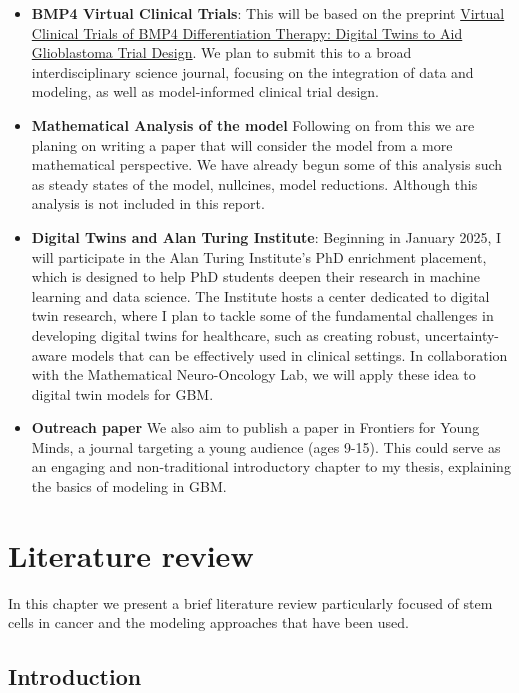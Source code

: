 \documentclass[
  letterpaper,
]{scrreprt}
\theoremstyle{definition}
\theoremstyle{remark}
\begin{document}
\begin{itemize}
\item
  \textbf{BMP4 Virtual Clinical Trials}: This will be based on the
  preprint
  \href{https://www.biorxiv.org/content/10.1101/2024.08.22.609156v1.abstract}{Virtual
  Clinical Trials of BMP4 Differentiation Therapy: Digital Twins to Aid
  Glioblastoma Trial Design}. We plan to submit this to a broad
  interdisciplinary science journal, focusing on the integration of data
  and modeling, as well as model-informed clinical trial design.
\item
  \textbf{Mathematical Analysis of the model} Following on from this we
  are planing on writing a paper that will consider the model from a
  more mathematical perspective. We have already begun some of this
  analysis such as steady states of the model, nullcines, model
  reductions. Although this analysis is not included in this report.
\item
  \textbf{Digital Twins and Alan Turing Institute}: Beginning in January
  2025, I will participate in the Alan Turing Institute's PhD enrichment
  placement, which is designed to help PhD students deepen their
  research in machine learning and data science. The Institute hosts a
  center dedicated to digital twin research, where I plan to tackle some
  of the fundamental challenges in developing digital twins for
  healthcare, such as creating robust, uncertainty-aware models that can
  be effectively used in clinical settings. In collaboration with the
  Mathematical Neuro-Oncology Lab, we will apply these idea to digital
  twin models for GBM.
\item
  \textbf{Outreach paper} We also aim to publish a paper in Frontiers
  for Young Minds, a journal targeting a young audience (ages 9-15).
  This could serve as an engaging and non-traditional introductory
  chapter to my thesis, explaining the basics of modeling in GBM.
\end{itemize}


\chapter{Literature review}\label{sec-lit-review}

In this chapter we present a brief literature review particularly
focused of stem cells in cancer and the modeling approaches that have
been used.

\section{Introduction}\label{sec-introduction-lit}
\end{document}
